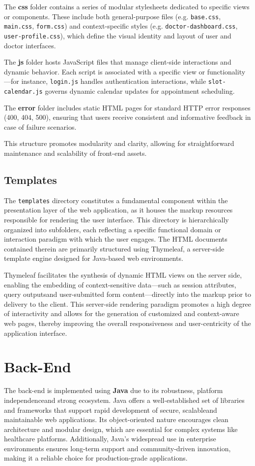 The \textbf{css} folder contains a series of modular stylesheets dedicated to specific views or components. These include both general-purpose files (e.g. \texttt{base.css}, \texttt{main.css}, \texttt{form.css}) and context-specific styles (e.g. \texttt{doctor-dashboard.css}, \texttt{user-profile.css}), which define the visual identity and layout of user and doctor interfaces.

The \textbf{js} folder hosts JavaScript files that manage client-side interactions and dynamic behavior. Each script is associated with a specific view or functionality—for instance, \texttt{login.js} handles authentication interactions, while \texttt{slot-calendar.js} governs dynamic calendar updates for appointment scheduling.

The \textbf{error} folder includes static HTML pages for standard HTTP error responses (400, 404, 500), ensuring that users receive consistent and informative feedback in case of failure scenarios.

This structure promotes modularity and clarity, allowing for straightforward maintenance and scalability of front-end assets.

\subsection{Templates}
The \texttt{templates} directory constitutes a fundamental component within the presentation layer of the web application, as it houses the markup resources responsible for rendering the user interface. This directory is hierarchically organized into subfolders, each reflecting a specific functional domain or interaction paradigm with which the user engages. The HTML documents contained therein are primarily structured using Thymeleaf, a server-side template engine designed for Java-based web environments.

Thymeleaf facilitates the synthesis of dynamic HTML views on the server side, enabling the embedding of context-sensitive data—such as session attributes, query outputsand user-submitted form content—directly into the markup prior to delivery to the client. This server-side rendering paradigm promotes a high degree of interactivity and allows for the generation of customized and context-aware web pages, thereby improving the overall responsiveness and user-centricity of the application interface.

\section{Back-End}
The back-end is implemented using \textbf{Java} due to its robustness, platform independenceand strong ecosystem. Java offers a well-established set of libraries and frameworks that support rapid development of secure, scalableand maintainable web applications. Its object-oriented nature encourages clean architecture and modular design, which are essential for complex systems like healthcare platforms. Additionally, Java's widespread use in enterprise environments ensures long-term support and community-driven innovation, making it a reliable choice for production-grade applications.

